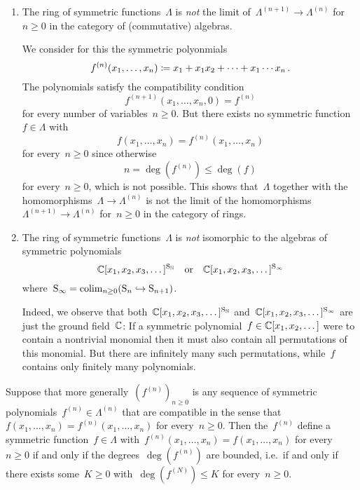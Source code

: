 \documentclass[a4paper, 11pt, twoside=semi]{scrartcl}
\begin{document}
\begin{warning}
  \leavevmode
  \begin{enumerate}
    \item
      The ring of symmetric functions~$\Lambda$ is \emph{not} the limit of~$\Lambda^{(n+1)} \to \Lambda^{(n)}$ for~$n \geq 0$ in the category of (commutative) algebras.

      We consider for this the symmetric polyonmials
      \[
        f^{ (n) }(x_1, \dotsc, x_n)
        \coloneqq
        x_1 + x_1 x_2 + \dotsb + x_1 \dotsm x_n \,.
      \]
      The polynomials satisfy the compatibility condition
      \[
        f^{(n+1)}(x_1, \dotsc, x_n, 0)
        =
        f^{(n)}
      \]
      for every number of variables~$n \geq 0$.
      But there exists no symmetric function~$f \in \Lambda$ with
      \[
        f(x_1, \dotsc, x_n) = f^{(n)}(x_1, \dotsc, x_n)
      \]
      for every~$n \geq 0$ since otherwise
      \[
        n
        =
        \deg(f^{(n)})
        \leq
        \deg(f)
      \]
      for every~$n \geq 0$, which is not possible.
      This shows that~$\Lambda$ together with the homomorphisms~$\Lambda \to \Lambda^{(n)}$ is not the limit of the homomorphisms~$\Lambda^{(n+1)} \to \Lambda^{(n)}$ for~$n \geq 0$ in the category of rings.
    \item
      The ring of symmetric functions~$\Lambda$ is \emph{not} isomorphic to the algebras of symmetric polynomials
      \[
        \mathbb{C}[x_1, x_2, x_3, \dotsc]^{\mathrm{S}_{\mathbb{N}}}
        \quad\text{or}\quad
        \mathbb{C}[x_1, x_2, x_3, \dotsc]^{\mathrm{S}_\infty}
      \]
      where~$\mathrm{S}_\infty = \operatorname*{colim}_{n \geq 0} (\mathrm{S}_n \hookrightarrow \mathrm{S}_{n+1})$.

      Indeed, we observe that both~$\mathbb{C}[x_1, x_2, x_3, \dotsc]^{\mathrm{S}_{\mathbb{N}}}$ and~$\mathbb{C}[x_1, x_2, x_3, \dotsc]^{\mathrm{S}_\infty}$ are just the ground field~$\mathbb{C}$:
      If a symmetric polynomial~$f \in \mathbb{C}[x_1, x_2, \dotsc]$ were to contain a nontrivial monomial then it must also contain all permutations of this monomial.
      But there are infinitely many such permutations, while~$f$ contains only finitely many polynomials.
  \end{enumerate}
\end{warning}

Suppose that more generally~$( f^{(n)} )_{n \geq 0}$ is any sequence of symmetric polynomials~$f^{(n)} \in \Lambda^{(n)}$ that are compatible in the sense that~$f(x_1, \dotsc, x_n) = f^{(n)}(x_1, \dotsc, x_n)$ for every~$n \geq 0$.
Then the~$f^{(n)}$ define a symmetric function~$f \in \Lambda$ with~$f^{(n)}(x_1, \dotsc, x_n) = f(x_1, \dotsc, x_n)$ for every~$n \geq 0$ if and only if the degrees~$\deg( f^{(n)} )$ are bounded, i.e.\ if and only if there exists some~$K \geq 0$ with~$\deg( f^{(N)} ) \leq K$ for every~$n \geq 0$.
\end{document}
